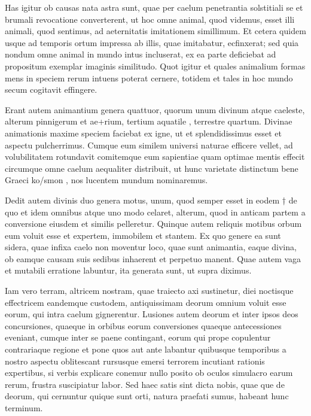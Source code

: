  Has igitur ob causas nata astra sunt, quae per caelum penetrantia solstitiali se et brumali revocatione converterent, ut hoc omne animal, quod videmus, esset illi animali, quod sentimus, ad aeternitatis imitationem simillimum. Et cetera quidem usque ad temporis ortum impressa ab illis, quae imitabatur, ecfinxerat; sed quia nondum omne animal in mundo intus incluserat, ex ea parte deficiebat ad propositum exemplar imaginis similitudo. Quot igitur et quales animalium formas mens in speciem rerum intuens poterat cernere, totidem et tales in hoc mundo secum cogitavit effingere.

 Erant autem animantium genera quattuor, quorum unum divinum atque caeleste, alterum pinnigerum et ae+rium, tertium aquatile , terrestre quartum. Divinae animationis maxime speciem faciebat ex igne, ut et splendidissimus esset et aspectu pulcherrimus. Cumque eum similem universi naturae efficere vellet, ad volubilitatem rotundavit comitemque eum sapientiae quam optimae mentis effecit circumque omne caelum aequaliter distribuit, ut hunc varietate distinctum bene Graeci ko/smon , nos lucentem mundum nominaremus.

 Dedit autem divinis duo genera motus, unum, quod semper esset in eodem † de quo et idem omnibus atque uno modo celaret, alterum, quod in anticam partem a conversione eiusdem et similis pelleretur. Quinque autem reliquis motibus orbum eum voluit esse et expertem, immobilem et stantem. Ex quo genere ea sunt sidera, quae infixa caelo non moventur loco, quae sunt animantia, eaque divina, ob eamque causam suis sedibus inhaerent et perpetuo manent. Quae autem vaga et mutabili erratione labuntur, ita generata sunt, ut supra diximus.

 Iam vero terram, altricem nostram, quae traiecto axi sustinetur, diei noctisque effectricem eandemque custodem, antiquissimam deorum omnium voluit esse eorum, qui intra caelum gignerentur. Lusiones autem deorum et inter ipsos deos concursiones, quaeque in orbibus eorum conversiones quaeque antecessiones eveniant, cumque inter se paene contingant, eorum qui prope copulentur contrariaque regione et pone quos aut ante labantur quibusque temporibus a nostro aspectu oblitescant rursusque emersi terrorem incutiant rationis expertibus, si verbis explicare conemur nullo posito ob oculos simulacro earum rerum, frustra suscipiatur labor. Sed haec satis sint dicta nobis, quae que de deorum, qui cernuntur quique sunt orti, natura praefati sumus, habeant hunc terminum.

